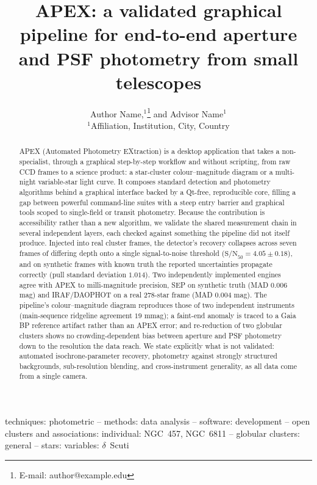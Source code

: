 \documentclass[fleqn,usenatbib]{mnras}
\title[APEX: a validated graphical photometry pipeline]{APEX: a validated graphical pipeline for end-to-end aperture and PSF photometry from small telescopes}
\author[Author et al.]{%
Author Name,$^{1}$\thanks{E-mail: author@example.edu}
and Advisor Name$^{1}$
\\
$^{1}$Affiliation, Institution, City, Country
}
\begin{document}
\label{firstpage}
\maketitle

\begin{abstract}
APEX (Automated Photometry EXtraction) is a desktop application that takes a non-specialist, through a graphical step-by-step workflow and without scripting, from raw CCD frames to a science product: a star-cluster colour--magnitude diagram or a multi-night variable-star light curve. It composes standard detection and photometry algorithms behind a graphical interface backed by a Qt-free, reproducible core, filling a gap between powerful command-line suites with a steep entry barrier and graphical tools scoped to single-field or transit photometry. Because the contribution is accessibility rather than a new algorithm, we validate the shared measurement chain in several independent layers, each checked against something the pipeline did not itself produce. Injected into real cluster frames, the detector's recovery collapses across seven frames of differing depth onto a single signal-to-noise threshold ($\mathrm{S/N}_{50}=4.05\pm0.18$), and on synthetic frames with known truth the reported uncertainties propagate correctly (pull standard deviation $1.014$). Two independently implemented engines agree with APEX to milli-magnitude precision, SEP on synthetic truth (MAD $0.006$ mag) and IRAF/DAOPHOT on a real 278-star frame (MAD $0.004$ mag). The pipeline's colour--magnitude diagram reproduces those of two independent instruments (main-sequence ridgeline agreement $19$ mmag); a faint-end anomaly is traced to a Gaia BP reference artifact rather than an APEX error; and re-reduction of two globular clusters shows no crowding-dependent bias between aperture and PSF photometry down to the resolution the data reach. We state explicitly what is not validated: automated isochrone-parameter recovery, photometry against strongly structured backgrounds, sub-resolution blending, and cross-instrument generality, as all data come from a single camera.
\end{abstract}

\begin{keywords}
techniques: photometric -- methods: data analysis -- software: development -- open clusters and associations: individual: NGC~457, NGC~6811 -- globular clusters: general -- stars: variables: $\delta$~Scuti
\end{keywords}
\end{document}
